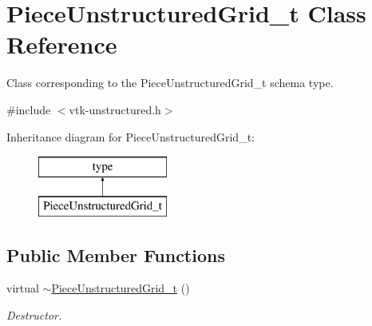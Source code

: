\hypertarget{classPieceUnstructuredGrid__t}{\section{Piece\-Unstructured\-Grid\-\_\-t Class Reference}
\label{classPieceUnstructuredGrid__t}
}


Class corresponding to the Piece\-Unstructured\-Grid\-\_\-t schema type.  




{\ttfamily \#include $<$vtk-\/unstructured.\-h$>$}

Inheritance diagram for Piece\-Unstructured\-Grid\-\_\-t\-:\begin{figure}[H]
\begin{center}
\leavevmode
\includegraphics[height=2.000000cm]{classPieceUnstructuredGrid__t}
\end{center}
\end{figure}
\subsection*{Public Member Functions}
\begin{DoxyCompactItemize}
\item 
virtual \hyperlink{classPieceUnstructuredGrid__t_a9d1eb720775ac4e3b7778f898decc264}{$\sim$\-Piece\-Unstructured\-Grid\-\_\-t} ()
\begin{DoxyCompactList}\small\item\em Destructor. \end{DoxyCompactList}\end{DoxyCompactItemize}
